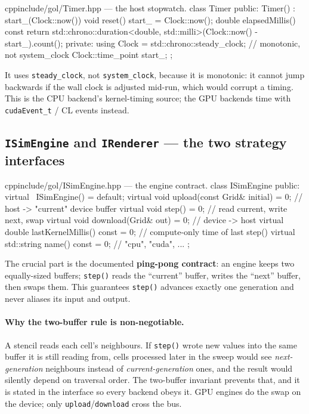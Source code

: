 \documentclass[
	english,
	letterpaper, oneside
]{article}
\begin{document}
\begin{sourcecode}{cpp}{include/gol/Timer.hpp --- the host stopwatch.}
class Timer {
public:
  Timer() : start_(Clock::now()) {}
  void reset() { start_ = Clock::now(); }
  double elapsedMillis() const {
    return std::chrono::duration<double, std::milli>(Clock::now() - start_).count();
  }
private:
  using Clock = std::chrono::steady_clock;   // monotonic, not system_clock
  Clock::time_point start_;
};
\end{sourcecode}

It uses \texttt{steady\_clock}, not \texttt{system\_clock}, because it is
monotonic: it cannot jump backwards if the wall clock is adjusted mid-run, which
would corrupt a timing. This is the CPU backend's kernel-timing source; the GPU
backends time with \texttt{cudaEvent\_t} / CL events instead.

\subsection{\texttt{ISimEngine} and \texttt{IRenderer} --- the two strategy interfaces}
\label{sec:interfaces}

\begin{sourcecode}{cpp}{include/gol/ISimEngine.hpp --- the engine contract.}
class ISimEngine {
public:
  virtual ~ISimEngine() = default;
  virtual void upload(const Grid& initial) = 0;   // host -> "current" device buffer
  virtual void step() = 0;                         // read current, write next, swap
  virtual void download(Grid& out) = 0;            // device -> host
  virtual double lastKernelMillis() const = 0;     // compute-only time of last step()
  virtual std::string name() const = 0;            // "cpu", "cuda", ...
};
\end{sourcecode}

The crucial part is the documented \textbf{ping-pong contract}: an engine keeps
two equally-sized buffers; \texttt{step()} reads the ``current'' buffer, writes
the ``next'' buffer, then swaps them. This guarantees \texttt{step()} advances
exactly one generation and never aliases its input and output.

\paragraph{Why the two-buffer rule is non-negotiable.} A stencil reads each
cell's neighbours. If \texttt{step()} wrote new values into the same buffer it is
still reading from, cells processed later in the sweep would see
\emph{next-generation} neighbours instead of \emph{current-generation} ones, and
the result would silently depend on traversal order. The two-buffer invariant
prevents that, and it is stated in the interface so every backend obeys it. GPU
engines do the swap on the device; only \texttt{upload}/\texttt{download} cross
the bus.
\end{document}
